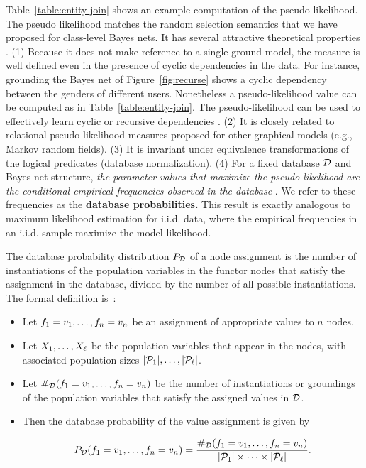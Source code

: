 \documentclass[oribibl]{llncs}
\begin{document}
\noindent Table~\ref{table:entity-join} shows an example computation of the pseudo likelihood.
%
The pseudo likelihood matches the random selection semantics that we have proposed for class-level Bayes nets. It has several attractive theoretical properties \cite{Schulte2011}. (1) Because it does not make reference to a single ground model, the measure is well defined even in the presence of cyclic dependencies in the data. For instance, grounding the Bayes net of Figure~\ref{fig:recurse} shows a cyclic dependency between the genders of different users. Nonetheless a pseudo-likelihood value can be computed as in Table~\ref{table:entity-join}. The pseudo-likelihood can be used to effectively learn cyclic or recursive dependencies \cite{Schulte2012}. (2) It is closely related to relational pseudo-likelihood measures proposed for other graphical models (e.g., Markov random fields). (3) It is invariant under equivalence transformations of the logical predicates (database normalization). (4) For a fixed database $\mathcal{D}$ and Bayes net structure, {\em the parameter values that maximize the pseudo-likelihood are the conditional empirical frequencies observed in the database} \cite[Prop.3.1]{Schulte2011}. We refer to these frequencies as the \textbf{database probabilities.} This result is exactly analogous to  maximum likelihood estimation for i.i.d. data, where the empirical frequencies in an i.i.d. sample maximize the  model likelihood.

The database probability distribution $P_{\mathcal{D}}$ of a node assignment is the number of instantiations of the population variables in the functor nodes that satisfy the assignment in the database, divided by the number of all possible instantiations. The formal definition is~\cite{Chiang2012}:

\begin{itemize}
\item Let $f_{1} = v_{1}, \ldots, f_{n} = v_{n}$ be an assignment of appropriate values to $n$ nodes. 
\item Let $X_{1},\ldots,X_{\ell}$ be the population variables that appear in the nodes, with associated population sizes $|\mathcal{P}_{1}|, \ldots, |\mathcal{P}_{\ell}|$.
\item Let $\#_{\mathcal{D}}(f_{1} = v_{1}, \ldots, f_{n} = v_{n})$ be the number of instantiations or groundings of the population variables that satisfy the assigned values in $\mathcal{D}$.
\item Then the database probability of the value assignment is given by

$$P_{\mathcal{D}}(f_{1} = v_{1}, \ldots, f_{n} = v_{n}) = \frac{\#_{\mathcal{D}}(f_{1} = v_{1}, \ldots, f_{n} = v_{n})}{|\mathcal{P}_{1}| \times \cdots \times |\mathcal{P}_{\ell}|}.$$
\end{itemize}
\end{document}
